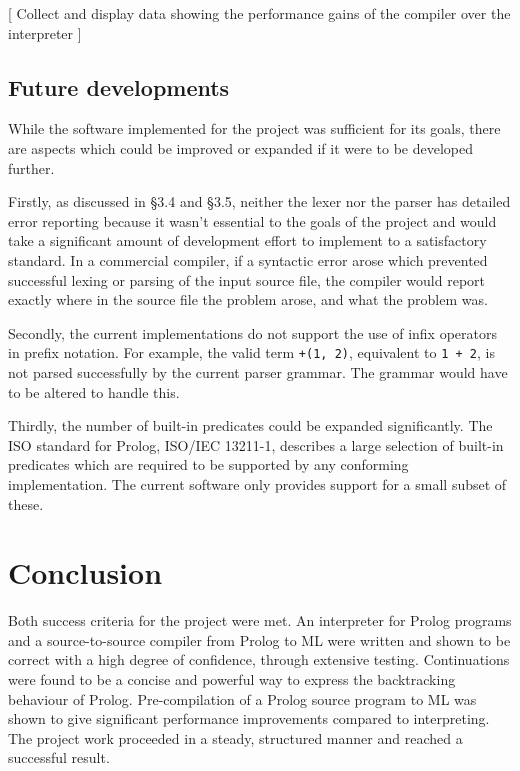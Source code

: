 \documentclass[12pt]{article}
\begin{document}
[ Collect and display data showing the performance gains of the compiler over the interpreter ]

\subsection{Future developments}

While the software implemented for the project was sufficient for its goals, there are aspects which could be improved or expanded if it were to be developed further.

Firstly, as discussed in \S3.4 and \S3.5, neither the lexer nor the parser has detailed error reporting because it wasn't essential to the goals of the project and would take a significant amount of development effort to implement to a satisfactory standard. 
In a commercial compiler, if a syntactic error arose which prevented successful lexing or parsing of the input source file, the compiler would report exactly where in the source file the problem arose, and what the problem was.

Secondly, the current implementations do not support the use of infix operators in prefix notation. 
For example, the valid term \verb|+(1, 2)|, equivalent to \verb|1 + 2|, is not parsed successfully by the current parser grammar. 
The grammar would have to be altered to handle this.

Thirdly, the number of built-in predicates could be expanded significantly. 
The ISO standard for Prolog, ISO/IEC 13211-1, describes a large selection of built-in predicates which are required to be supported by any conforming implementation. 
The current software only provides support for a small subset of these.


\newpage

\section{Conclusion}

Both success criteria for the project were met. An interpreter for Prolog programs and a source-to-source compiler from Prolog to ML were written and shown to be correct with a high degree of confidence, through extensive testing. Continuations were found to be a concise and powerful way to express the backtracking behaviour of Prolog. Pre-compilation of a Prolog source program to ML was shown to give significant performance improvements compared to interpreting. The project work proceeded in a steady, structured manner and reached a successful result. 
\end{document}
